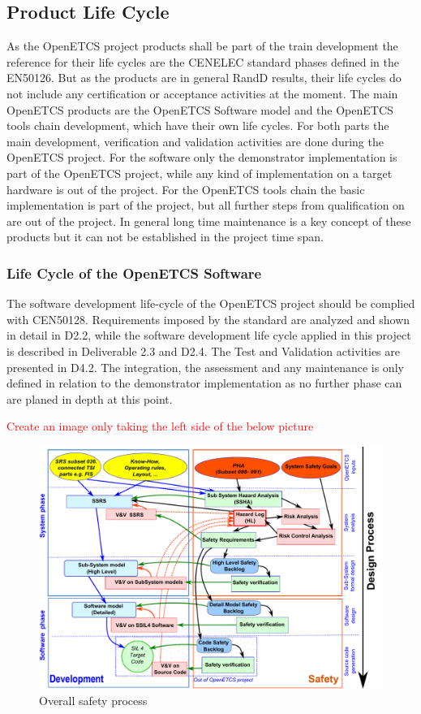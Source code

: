 \documentclass{template/openetcs_article}
\begin{document}
\subsection{Product Life Cycle }

As the OpenETCS project products shall be part of the train development the reference for their life cycles are the CENELEC standard phases defined in the EN50126. But as the products are in general \gls{RandD} results, their life cycles do not include any certification or acceptance activities at the moment.
The main OpenETCS products are the OpenETCS Software model and the OpenETCS tools chain development, which have their own life cycles. For both parts the main development, verification and validation activities are done during the OpenETCS project. For the software only the demonstrator implementation is part of the OpenETCS project, while any kind of implementation on a target hardware is out of the project. 
For the OpenETCS tools chain the basic implementation is part of the project, but all further steps from qualification on are out of the project.
In general long time maintenance is a key concept of these products but it can not be established in the project time span. 

\subsubsection{Life Cycle of the OpenETCS Software}
The software development life-cycle of the OpenETCS project should be complied with CEN50128. Requirements imposed by the standard are analyzed and shown in detail in D2.2, while the software development life cycle applied in this project is described in Deliverable 2.3 and D2.4. The Test and Validation activities are presented in D4.2. The integration, the assessment and any maintenance is only defined in relation to the demonstrator implementation as no further phase can are planed in depth at this point.

\textcolor{red}{Create an image only taking the left side of the below picture}
\begin{figure}[H]
\centering
\includegraphics[width=0.7\linewidth]{./figures/WholeSafetyProcess}
\caption[Overall safety process]{Overall safety process}
\label{fig:SafetyProcess}
\end{figure}
\end{document}
